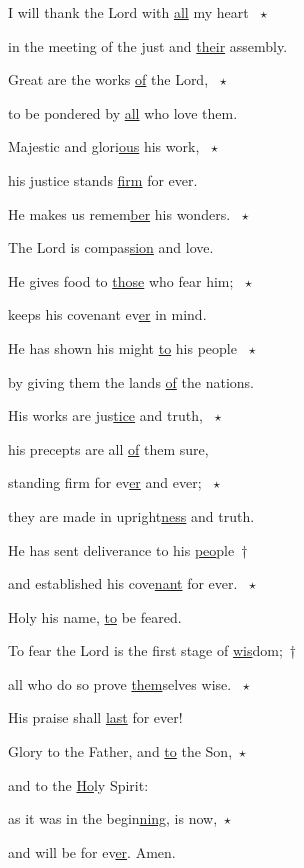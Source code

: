 \noindent I will thank the Lord with \uline{all} my heart ~$\star$~\nopagebreak

in the meeting of the just and \uline{their} assembly.

\noindent Great are the works \uline{of} the Lord, ~$\star$~\nopagebreak

to be pondered by \uline{all} who love them.



\noindent Majestic and glori\uline{ous} his work, ~$\star$~\nopagebreak

his justice stands \uline{firm} for ever.

\noindent He makes us remem\uline{ber} his wonders. ~$\star$~\nopagebreak

The Lord is compas\uline{sion} and love.



\noindent He gives food to \uline{those} who fear him; ~$\star$~\nopagebreak

keeps his covenant ev\uline{er} in mind.

\noindent He has shown his might \uline{to} his people ~$\star$~\nopagebreak

by giving them the lands \uline{of} the nations.



\noindent His works are jus\uline{tice} and truth, ~$\star$~\nopagebreak

his precepts are all \uline{of} them sure,

\noindent standing firm for ev\uline{er} and ever; ~$\star$~\nopagebreak

they are made in upright\uline{ness} and truth.



\noindent He has sent deliverance to his \uline{peo}ple~†~\nopagebreak

and established his cove\uline{nant} for ever. ~$\star$~\nopagebreak

Holy his name, \uline{to} be feared.



\noindent To fear the Lord is the first stage of \uline{wis}dom;~†~\nopagebreak

all who do so prove \uline{them}selves wise. ~$\star$~\nopagebreak

His praise shall \uline{last} for ever!



\noindent Glory to the Father, and \uline{to} the Son,~$\star$~\nopagebreak

and to the \uline{Ho}ly Spirit:

\noindent as it was in the begin\uline{ning}, is now,~$\star$~\nopagebreak

and will be for ev\uline{er}. Amen.
